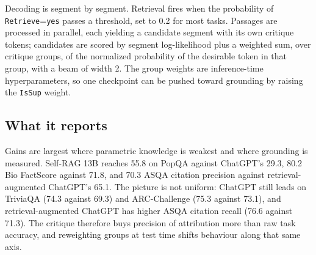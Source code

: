 \begin{center}
\end{center}

Decoding is segment by segment. Retrieval fires when the probability of \texttt{Retrieve}=\texttt{yes} passes a threshold, set to 0.2 for most tasks. Passages are processed in parallel, each yielding a candidate segment with its own critique tokens; candidates are scored by segment log-likelihood plus a weighted sum, over critique groups, of the normalized probability of the desirable token in that group, with a beam of width 2. The group weights are inference-time hyperparameters, so one checkpoint can be pushed toward grounding by raising the \texttt{IsSup} weight.

\subsection{What it reports}

Gains are largest where parametric knowledge is weakest and where grounding is measured. Self-RAG 13B reaches 55.8 on PopQA against ChatGPT's 29.3, 80.2 Bio FactScore against 71.8, and 70.3 ASQA citation precision against retrieval-augmented ChatGPT's 65.1. The picture is not uniform: ChatGPT still leads on TriviaQA (74.3 against 69.3) and ARC-Challenge (75.3 against 73.1), and retrieval-augmented ChatGPT has higher ASQA citation recall (76.6 against 71.3). The critique therefore buys precision of attribution more than raw task accuracy, and reweighting groups at test time shifts behaviour along that same axis.

